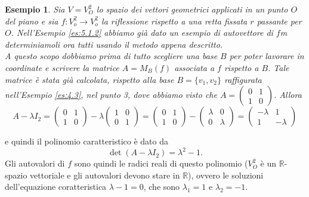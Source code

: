 \documentclass{book}
\newtheorem{esempio}{Esempio}[section]
\begin{document}
\begin{esempio}
  \label{es:5.2.1.}
  Sia $V=V_O^2$ lo spazio dei vettori geometrici applicati in un punto $O$ del piano e sia $f:V_o^2\to V_o^2$ la
  riflessione rispetto a una retta fissata $r$ passante per $O$. Nell'Esempio \ref{es:5.1.2} abbiamo già dato un
  esempio di autovettore di $f$m determiniamoli ora tutti usando il metodo appena descritto.\\
  A questo scopo dobbiamo prima di tutto scegliere una base $B$ per poter lavorare in coordinate e scrivere la
  matrice $A=M_B(f)$ associata a $f$ rispetto a $B$. Tale matrice è stata già calcolata, rispetto alla base
  $B= \{v_1,v_2\}$ raffigurata nell'Esempio \ref{es:4.3}, nel punto 3, dove abbiamo visto che $A=
  \begin{pmatrix}
    0 &1 \\
    1 & 0
  \end{pmatrix}
  $. Allora
  \begin{equation}
    \label{eq:5.7}
    A-\lambda I_2=
    \begin{pmatrix}
      0 &1\\
      1 & 0
    \end{pmatrix}-\lambda
    \begin{pmatrix}
      1 & 0\\
      0 & 1
    \end{pmatrix}=
    \begin{pmatrix}
      0 & 1\\
      1 & 0
    \end{pmatrix}-
    \begin{pmatrix}
      \lambda & 0\\
      0 & \lambda
    \end{pmatrix}=
    \begin{pmatrix}
      -\lambda & 1 \\
      1 & -\lambda
    \end{pmatrix}
  \end{equation}
\end{esempio}
e quindi il polinomio caratteristico è dato da
\begin{equation*}
  \det(A-\lambda I_2) = \lambda^2-1.
\end{equation*}
Gli autovalori di $f$ sono quindi le radici reali di questo polinomio ($V_O^2$ è un $\mathds{R}$-spazio vettoriale
e gli autovalori devono stare in $\mathds{R}$), ovvero le soluzioni dell'equazione coratteristica $\lambda-1=0$,
che sono $\lambda_1=1$ e $\lambda_2=-1$.\\
\end{document}
